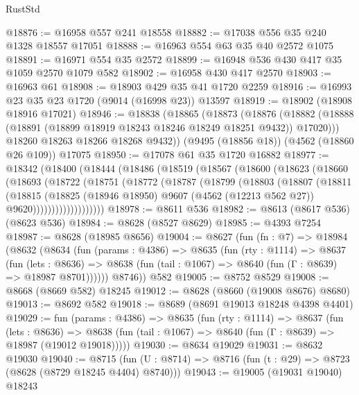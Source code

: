 \begin{lexlean}{RustStd}
\begin{coremodule}
@18876 := @16958 @557 @241 @18558
@18882 := @17038 @556 @35 @240 @1328 @18557 @17051
@18888 := @16963 @554 @63 @35 @40 @2572 @1075
@18891 := @16971 @554 @35 @2572
@18899 := @16948 @536 @430 @417 @35 @1059 @2570 @1079 @582
@18902 := @16958 @430 @417 @2570
@18903 := @16963 @61
@18908 := @18903 @429 @35 @41 @1720 @2259
@18916 := @16993 @23 @35 @23 @1720 (@9014 (@16998 @23)) @13597
@18919 := @18902 (@18908 @18916 @17021)
@18946 := @18838
    (@18865
      (@18873
        (@18876 (@18882 (@18888 (@18891 (@18899 @18919 @18243 @18246 @18249 @18251 @9432)) @17020)))
        @18260
        @18263
        @18266
        @18268
        @9432))
    (@9495 (@18856 @18))
    (@4562 (@18860 @26 @109))
    @17075
@18950 := @17078 @61 @35 @1720 @16882
@18977 := @18342
    (@18400
      (@18444
        (@18486
          (@18519
            (@18567
              (@18600
                (@18623
                  (@18660
                    (@18693
                      (@18722
                        (@18751
                          (@18772
                            (@18787
                              (@18799
                                (@18803
                                  (@18807
                                    (@18811
                                      (@18815
                                        (@18825
                                          (@18946 @18950)
                                          @9607
                                          (@4562 (@12213 @562 @27))
                                          @9620)))))))))))))))))))
@18978 := @8611 @536
@18982 := @8613 (@8617 @536) (@8623 @536)
@18984 := @8628 (@8527 @8629)
@18985 := @4393 @7254
@18987 := @8628 (@18985 @8656)
@19004 := @8627
    (fun (fn : @7) =>
    @18984
      (@8632
        (@8634
          (fun (params : @4386) =>
          @8635
            (fun (rty : @1114) =>
            @8637
              (fun (lets : @8636) =>
              @8638 (fun (tail : @1067) => @8640 (fun (Γ : @8639) => @18987 @8701))))))
        @8746))
    @582
@19005 := @8752 @8529
@19008 := @8668 (@8669 @582) @18245
@19012 := @8628 (@8660 (@19008 @8676) @8680)
@19013 := @8692 @582
@19018 := @8689 (@8691 @19013 @18248 @4398 @4401)
@19029 := fun (params : @4386) =>
  @8635
    (fun (rty : @1114) =>
    @8637
      (fun (lets : @8636) =>
      @8638 (fun (tail : @1067) => @8640 (fun (Γ : @8639) => @18987 (@19012 @19018)))))
@19030 := @8634 @19029
@19031 := @8632 @19030
@19040 := @8715
    (fun (U : @8714) => @8716 (fun (t : @29) => @8723 (@8628 (@8729 @18245 @4404) @8740)))
@19043 := @19005 (@19031 @19040) @18243

\end{coremodule}
\end{lexlean}
